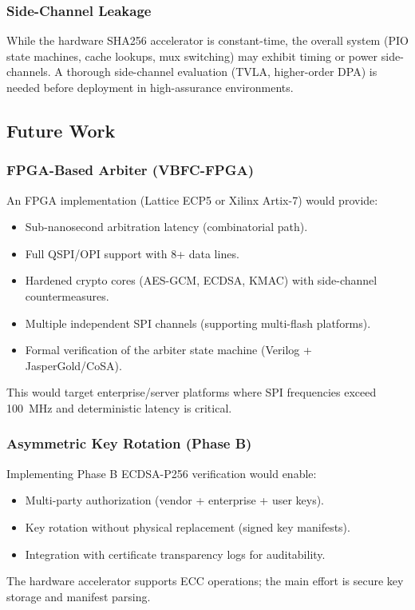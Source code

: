\subsubsection{Side-Channel Leakage}
While the hardware SHA256 accelerator is constant-time, the overall system (PIO state machines, cache lookups, mux switching) may exhibit timing or power side-channels. A thorough side-channel evaluation (TVLA, higher-order DPA) is needed before deployment in high-assurance environments.

\subsection{Future Work}

\subsubsection{FPGA-Based Arbiter (VBFC-FPGA)}
An FPGA implementation (Lattice ECP5 or Xilinx Artix-7) would provide:
\begin{itemize}
    \item Sub-nanosecond arbitration latency (combinatorial path).
    \item Full QSPI/OPI support with 8+ data lines.
    \item Hardened crypto cores (AES-GCM, ECDSA, KMAC) with side-channel countermeasures.
    \item Multiple independent \ac{SPI} channels (supporting multi-flash platforms).
    \item Formal verification of the arbiter state machine (Verilog + JasperGold/CoSA).
\end{itemize}
This would target enterprise/server platforms where \ac{SPI} frequencies exceed \SI{100}{MHz} and deterministic latency is critical.

\subsubsection{Asymmetric Key Rotation (Phase B)}
Implementing Phase B ECDSA-P256 verification would enable:
\begin{itemize}
    \item Multi-party authorization (vendor + enterprise + user keys).
    \item Key rotation without physical \vbfc replacement (signed key manifests).
    \item Integration with certificate transparency logs for auditability.
\end{itemize}
The \rp hardware accelerator supports ECC operations; the main effort is secure key storage and manifest parsing.

